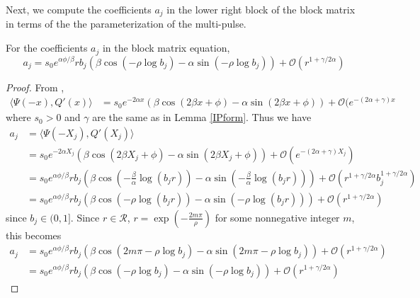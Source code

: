 \documentclass[thesis.tex]{subfiles}
\begin{document}
Next, we compute the coefficients $a_j$ in the lower right block of the block matrix in terms of the the parameterization of the multi-pulse.

\begin{lemma}\label{lemma:ajparam}
For the coefficients $a_j$ in the block matrix equation, 
\begin{equation}\label{ajparam}
a_j = s_0 e^{\alpha \phi/\beta} r b_j \left( \beta \cos\left(-\rho \log b_j \right) - \alpha \sin \left(-\rho \log b_j \right) \right) + \mathcal{O}(r^{1+\gamma/2\alpha})
\end{equation}

\begin{proof}
From \cite[Lemma 6.1]{Sandstede1998},
\begin{align*}\label{IPpsiQprime}
\langle \Psi(-x), Q'(x) \rangle
&= s_0 e^{-2 \alpha x}\left( \beta \cos(2 \beta x + \phi) - \alpha \sin(2 \beta x + \phi)\right) + \mathcal{O}(e^{-(2 \alpha + \gamma) x}
\end{align*}
where $s_0 > 0$ and $\gamma$ are the same as in Lemma \ref{IPform}. Thus we have
\begin{align*}
a_j &= \langle \Psi(-X_j), Q'(X_j) \rangle \\
&= s_0 e^{-2 \alpha X_j}\left( \beta \cos(2 \beta X_j + \phi) - \alpha \sin(2 \beta X_j + \phi)\right) + \mathcal{O}(e^{-(2 \alpha + \gamma) X_j}) \\
&= s_0 e^{\alpha \phi/\beta} r b_j \left( \beta \cos\left( -\frac{\beta}{\alpha} \log(b_j r) \right) - \alpha \sin \left( -\frac{\beta}{\alpha} \log(b_j r) \right) \right) + \mathcal{O}(r^{1+\gamma/2\alpha} b_j^{1 + \gamma/2\alpha}) \\
&= s_0 e^{\alpha \phi/\beta} r b_j \left( \beta \cos\left( -\rho \log(b_j r) \right) - \alpha \sin \left( -\rho \log(b_j r) \right) \right) + \mathcal{O}(r^{1+\gamma/2\alpha})
\end{align*}
since $b_j \in (0, 1]$. Since $r \in \mathcal{R}$, $r = \exp\left(-\frac{2 m \pi}{\rho}\right)$ for some nonnegative integer $m$, this becomes 
\begin{align*}
a_j &= s_0 e^{\alpha \phi/\beta} r b_j \left( \beta \cos\left( 2 m \pi -\rho \log b_j \right) - \alpha \sin \left( 2 m \pi -\rho \log b_j \right) \right) + \mathcal{O}(r^{1+\gamma/2\alpha}) \\
&= s_0 e^{\alpha \phi/\beta} r b_j \left( \beta \cos\left(-\rho \log b_j \right) - \alpha \sin \left(-\rho \log b_j \right) \right) + \mathcal{O}(r^{1+\gamma/2\alpha})
\end{align*}

\end{proof}
\end{lemma}
\end{document}
